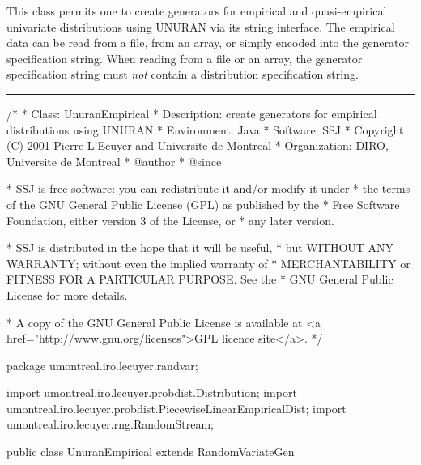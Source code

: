 
This class permits one to create generators for empirical and 
quasi-empirical univariate distributions
using UNURAN via its string interface.
The empirical data can be read from a file, from an array, or simply
encoded into the generator specification string.  
When reading from a file or an array, the generator specification 
string must \emph{not} contain a distribution specification string.

\bigskip\hrule

\begin{code}
\begin{hide}
/*
 * Class:        UnuranEmpirical
 * Description:  create generators for empirical distributions using UNURAN
 * Environment:  Java
 * Software:     SSJ 
 * Copyright (C) 2001  Pierre L'Ecuyer and Universite de Montreal
 * Organization: DIRO, Universite de Montreal
 * @author       
 * @since

 * SSJ is free software: you can redistribute it and/or modify it under
 * the terms of the GNU General Public License (GPL) as published by the
 * Free Software Foundation, either version 3 of the License, or
 * any later version.

 * SSJ is distributed in the hope that it will be useful,
 * but WITHOUT ANY WARRANTY; without even the implied warranty of
 * MERCHANTABILITY or FITNESS FOR A PARTICULAR PURPOSE.  See the
 * GNU General Public License for more details.

 * A copy of the GNU General Public License is available at
   <a href="http://www.gnu.org/licenses">GPL licence site</a>.
 */
\end{hide}
package umontreal.iro.lecuyer.randvar;\begin{hide}
import umontreal.iro.lecuyer.probdist.Distribution;
import umontreal.iro.lecuyer.probdist.PiecewiseLinearEmpiricalDist;
import umontreal.iro.lecuyer.rng.RandomStream;\end{hide} 

public class UnuranEmpirical extends RandomVariateGen\begin{hide} {
   private RandUnuran unuran = new RandUnuran();
\end{hide}\end{code}

